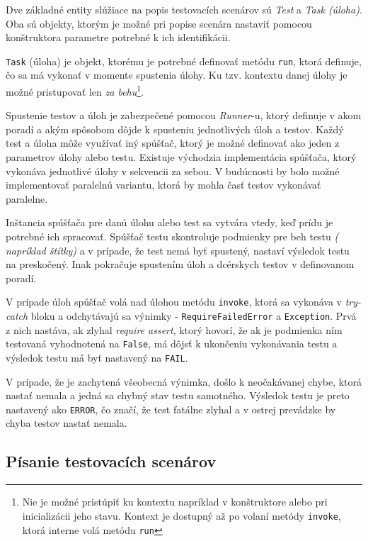 \documentclass[
  digital, %
  twoside, %
  table,   %
  lof,     %
  lot,     %
]{fithesis3}
\begin{document}
Dve základné entity slúžiace na popis testovacích scenárov sú \emph{Test} a \emph{Task (úloha)}. Oba sú objekty, ktorým je možné pri popise scenára nastaviť pomocou konštruktora parametre potrebné k ich identifikácii. 

\texttt{Task} (úloha) je objekt, ktorému je potrebné definovať metódu \texttt{run}, ktorá definuje, čo sa má vykonať v momente spustenia úlohy. Ku tzv. kontextu danej úlohy je možné pristupovať len \emph{za behu}\footnote{Nie je možné pristúpiť ku kontextu napríklad v konštruktore alebo pri inicializácii jeho stavu. Kontext je dostupný až po volaní metódy \texttt{invoke}, ktorá interne volá metódu \texttt{run}}.

Spustenie testov a úloh je zabezpečené pomocou \emph{Runner}-u, ktorý definuje v akom poradí a akým spôsobom dôjde k spusteniu jednotlivých úloh a testov. Každý test a úloha môže využívať iný spúšťač, ktorý je možné definovať ako jeden z parametrov úlohy alebo testu. Existuje východzia implementácia spúšťača, ktorý vykonáva jednotlivé úlohy v sekvencii za sebou. V budúcnosti by bolo možné implementovať paralelnú variantu, ktorá by mohla časť testov vykonávať paralelne.

Inštancia spúšťača pre danú úlohu alebo test sa vytvára vtedy, keď prídu je potrebné ich spracovať. Spúšťač testu skontroluje podmienky pre beh testu \emph{( napríklad štítky)} a v prípade, že test nemá byť spustený, nastaví výsledok testu na preskočený. Inak pokračuje spustením úloh a dcérskych testov v definovanom poradí.

V prípade úloh spúšťač volá nad úlohou metódu \texttt{invoke}, ktorá sa vykonáva v \emph{try-catch} bloku a odchytávajú sa výnimky - \texttt{RequireFailedError} a \texttt{Exception}. Prvá z nich nastáva, ak zlyhal \emph{require assert}, ktorý hovorí, že ak je podmienka ním testovaná vyhodnotená na \texttt{False}, má dôjsť k ukončeniu vykonávania testu a výsledok testu má byť nastavený na \texttt{FAIL}.

V prípade, že je zachytená všeobecná výnimka, došlo k neočakávanej chybe, ktorá nastať nemala a jedná sa chybný stav testu samotného. Výsledok testu je preto nastavený ako \texttt{ERROR}, čo značí, že test fatálne zlyhal a v ostrej prevádzke by chyba testov nastať nemala. 

\subsection{Písanie testovacích scenárov}
\end{document}
